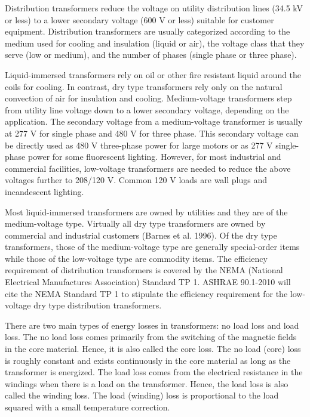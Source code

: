 Distribution transformers reduce the voltage on utility distribution lines (34.5 kV or less) to a lower secondary voltage (600 V or less) suitable for customer equipment. Distribution transformers are usually categorized according to the medium used for cooling and insulation (liquid or air), the voltage class that they serve (low or medium), and the number of phases (single phase or three phase).

Liquid-immersed transformers rely on oil or other fire resistant liquid around the coils for cooling. In contrast, dry type transformers rely only on the natural convection of air for insulation and cooling. Medium-voltage transformers step from utility line voltage down to a lower secondary voltage, depending on the application. The secondary voltage from a medium-voltage transformer is usually at 277 V for single phase and 480 V for three phase. This secondary voltage can be directly used as 480 V three-phase power for large motors or as 277 V single-phase power for some fluorescent lighting. However, for most industrial and commercial facilities, low-voltage transformers are needed to reduce the above voltages further to 208/120 V. Common 120 V loads are wall plugs and incandescent lighting.

Most liquid-immersed transformers are owned by utilities and they are of the medium-voltage type. Virtually all dry type transformers are owned by commercial and industrial customers (Barnes et al. 1996). Of the dry type transformers, those of the medium-voltage type are generally special-order items while those of the low-voltage type are commodity items. The efficiency requirement of distribution transformers is covered by the NEMA (National Electrical Manufactures Association) Standard TP 1. ASHRAE 90.1-2010 will cite the NEMA Standard TP 1 to stipulate the efficiency requirement for the low-voltage dry type distribution transformers.

There are two main types of energy losses in transformers: no load loss and load loss. The no load loss comes primarily from the switching of the magnetic fields in the core material. Hence, it is also called the core loss. The no load (core) loss is roughly constant and exists continuously in the core material as long as the transformer is energized. The load loss comes from the electrical resistance in the windings when there is a load on the transformer. Hence, the load loss is also called the winding loss. The load (winding) loss is proportional to the load squared with a small temperature correction.

